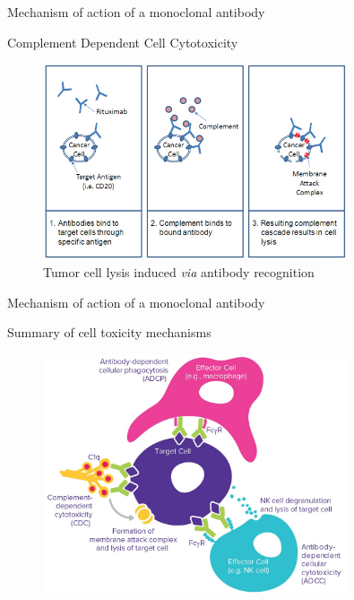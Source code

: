 \begin{frame}{Mechanism of action of a monoclonal antibody}
    \begin{block}{Complement Dependent Cell Cytotoxicity}
        \begin{figure}
            \centering
            \includegraphics[width=0.8\textwidth]{../Images/complement-dependent-cellular-cytotoxicity.jpg}
            \caption{Tumor cell lysis induced \emph{via} antibody recognition}
            \label{fig:CDCC}
        \end{figure}
    \end{block}
\end{frame}

\begin{frame}{Mechanism of action of a monoclonal antibody}
    \begin{block}{Summary of cell toxicity mechanisms}
        \begin{figure}
            \centering
            \includegraphics[width=0.8\textwidth]{../Images/recap_toxicity.jpg}
            \label{fig:summary}
        \end{figure}
    \end{block}
\end{frame}